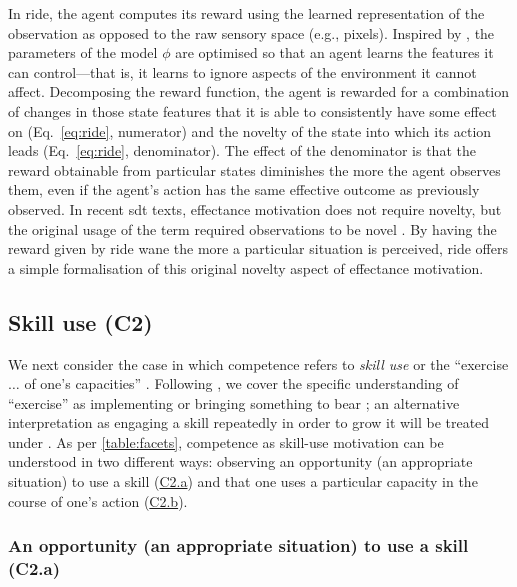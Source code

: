 \documentclass[10pt,letterpaper]{article}
\begin{document}
In \gls{ride}, the agent computes its reward using the learned representation of the observation as opposed to the raw sensory space (e.g., pixels). Inspired by \citet{pathak2017curiosity}, the parameters of the model $\phi$ are optimised so that an agent learns the features it can control---that is, it learns to ignore aspects of the environment it cannot affect. Decomposing the reward function, the agent is rewarded for a combination of changes in those state features that it is able to consistently have some effect on (Eq.~\ref{eq:ride}, numerator) and the novelty of the state into which its action leads (Eq.~\ref{eq:ride}, denominator). The effect of the denominator is that the reward obtainable from particular states diminishes the more the agent observes them, even if the agent's action has the same effective outcome as previously observed. In recent \gls{sdt} texts, effectance motivation does not require novelty, but the original usage of the term required observations to be novel \citep[p.~322]{white1959motivation}. By having the reward given by \gls{ride} wane the more a particular situation is perceived, \gls{ride} offers a simple formalisation of this original novelty aspect of effectance motivation.


\subsection{Skill use (C2)}
\label{sec:skilluse}

We next consider the case in which competence refers to \emph{skill use} or the ``exercise $\ldots$ of one's capacities'' \citep[p.~86]{ryan2017self}. Following \citet[p.~6]{deterding2024why}, we cover the specific understanding of ``exercise'' as implementing or bringing something to bear \citep{webster2025}; an alternative interpretation as engaging a skill repeatedly in order to grow it will be treated under . As per \autoref{table:facets}, competence as skill-use motivation can be understood in two different ways: observing an opportunity (an appropriate situation) to use a skill (\hyperref[sec:c2a]{C2.a}) and that one uses a particular capacity in the course of one's action (\hyperref[sec:c2b]{C2.b}).


\subsubsection{An opportunity (an appropriate situation) to use a skill (C2.a)}
 \label{sec:c2a}
\end{document}
